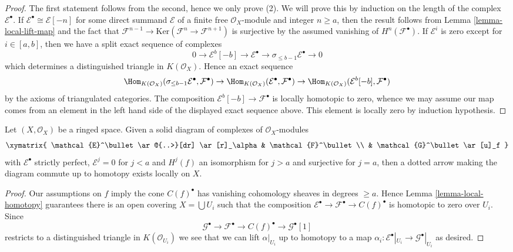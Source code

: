 \begin{proof}
The first statement follows from the second, hence we only prove (2).
We will prove this by induction on the length of the complex
$\mathcal{E}^\bullet$. If $\mathcal{E}^\bullet \cong \mathcal{E}[-n]$
for some direct summand $\mathcal{E}$ of a finite free
$\mathcal{O}_X$-module and integer $n \geq a$, then the result follows from
Lemma \ref{lemma-local-lift-map} and the fact that
$\mathcal{F}^{n - 1} \to \text{Ker}(\mathcal{F}^n \to \mathcal{F}^{n + 1})$
is surjective by the assumed vanishing of $H^n(\mathcal{F}^\bullet)$.
If $\mathcal{E}^i$ is zero except for $i \in [a, b]$, then we have a
split exact sequence of complexes
$$
0 \to \mathcal{E}^b[-b] \to \mathcal{E}^\bullet \to
\sigma_{\leq b - 1}\mathcal{E}^\bullet \to 0
$$
which determines a distinguished triangle in
$K(\mathcal{O}_X)$. Hence an exact sequence
$$
\Hom_{K(\mathcal{O}_X)}(
\sigma_{\leq b - 1}\mathcal{E}^\bullet, \mathcal{F}^\bullet)
\to
\Hom_{K(\mathcal{O}_X)}(\mathcal{E}^\bullet, \mathcal{F}^\bullet)
\to
\Hom_{K(\mathcal{O}_X)}(\mathcal{E}^b[-b], \mathcal{F}^\bullet)
$$
by the axioms of triangulated categories. The composition
$\mathcal{E}^b[-b] \to \mathcal{F}^\bullet$ is locally homotopic to
zero, whence we may assume our map comes from an element in the
left hand side of the displayed exact sequence above. This element
is locally zero by induction hypothesis.
\end{proof}

\begin{lemma}
\label{lemma-lift-through-quasi-isomorphism}
Let $(X, \mathcal{O}_X)$ be a ringed space.
Given a solid diagram of complexes of $\mathcal{O}_X$-modules
$$
\xymatrix{
\mathcal{E}^\bullet \ar@{..>}[dr] \ar[r]_\alpha & \mathcal{F}^\bullet \\
& \mathcal{G}^\bullet \ar[u]_f
}
$$
with $\mathcal{E}^\bullet$ strictly perfect, $\mathcal{E}^j = 0$ for
$j < a$ and $H^j(f)$ an isomorphism for $j > a$ and surjective for $j = a$,
then a dotted arrow making the diagram commute up to homotopy
exists locally on $X$.
\end{lemma}

\begin{proof}
Our assumptions on $f$ imply the cone $C(f)^\bullet$ has vanishing
cohomology sheaves in degrees $\geq a$.
Hence Lemma \ref{lemma-local-homotopy} guarantees there is an open
covering $X = \bigcup U_i$ such that the composition
$\mathcal{E}^\bullet \to \mathcal{F}^\bullet \to C(f)^\bullet$
is homotopic to zero over $U_i$. Since
$$
\mathcal{G}^\bullet \to \mathcal{F}^\bullet \to C(f)^\bullet \to
\mathcal{G}^\bullet[1]
$$
restricts to a distinguished triangle in $K(\mathcal{O}_{U_i})$
we see that we can lift $\alpha|_{U_i}$ up to homotopy to a map
$\alpha_i : \mathcal{E}^\bullet|_{U_i} \to \mathcal{G}^\bullet|_{U_i}$
as desired.
\end{proof}

